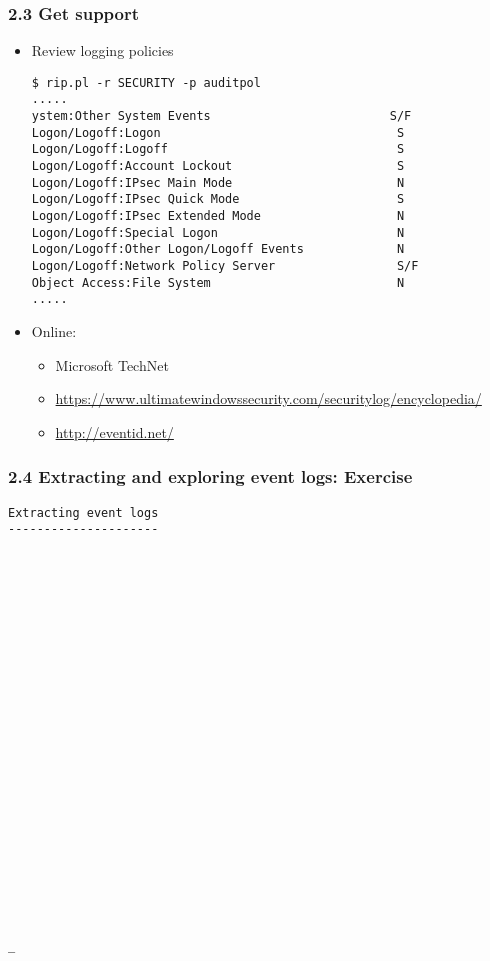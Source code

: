 \begin{frame}[fragile]
  \frametitle{2.3 Get support}
    \begin{itemize}
        \item Review logging policies
  \begin{lstlisting}[basicstyle=\tiny]
$ rip.pl -r SECURITY -p auditpol
.....
ystem:Other System Events                         S/F  
Logon/Logoff:Logon                                 S    
Logon/Logoff:Logoff                                S    
Logon/Logoff:Account Lockout                       S    
Logon/Logoff:IPsec Main Mode                       N    
Logon/Logoff:IPsec Quick Mode                      S    
Logon/Logoff:IPsec Extended Mode                   N    
Logon/Logoff:Special Logon                         N    
Logon/Logoff:Other Logon/Logoff Events             N    
Logon/Logoff:Network Policy Server                 S/F  
Object Access:File System                          N    
.....
  \end{lstlisting}
        \item Online:
            \begin{itemize}
                \item Microsoft TechNet
		\item \url{https://www.ultimatewindowssecurity.com/securitylog/encyclopedia/}
		\item \url{http://eventid.net/}
            \end{itemize}
    \end{itemize}
\end{frame}


\begin{frame}[fragile]
  \frametitle{2.4 Extracting and exploring event logs: Exercise}
  \begin{lstlisting}[basicstyle=\tiny]
Extracting event logs
---------------------
























_
  \end{lstlisting}
\end{frame}


